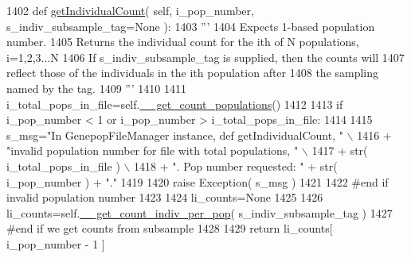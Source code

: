 \begin{DoxyCode}
1402     \textcolor{keyword}{def }\hyperlink{classnegui_1_1genepopfilemanager_1_1GenepopFileManager_a05e723069f5129b21a4d017c2a5317b0}{getIndividualCount}( self, i\_pop\_number, s\_indiv\_subsample\_tag=None ):
1403         \textcolor{stringliteral}{'''}
1404 \textcolor{stringliteral}{        Expects 1-based population number.}
1405 \textcolor{stringliteral}{        Returns the individual count for the ith of N populations, i=1,2,3...N}
1406 \textcolor{stringliteral}{        If s\_indiv\_subsample\_tag is supplied, then the counts will}
1407 \textcolor{stringliteral}{        reflect those of the individuals in the ith population after}
1408 \textcolor{stringliteral}{        the sampling named by the tag.}
1409 \textcolor{stringliteral}{        '''}
1410 
1411         i\_total\_pops\_in\_file=self.\hyperlink{classnegui_1_1genepopfilemanager_1_1GenepopFileManager_a51f6dcbd17c80f8e61114b11283b655f}{\_\_get\_count\_populations}()  
1412 
1413         \textcolor{keywordflow}{if} i\_pop\_number < 1 \textcolor{keywordflow}{or} i\_pop\_number > i\_total\_pops\_in\_file:
1414 
1415             s\_msg=\textcolor{stringliteral}{"In GenepopFileManager instance, def getIndividualCount, "} \(\backslash\)
1416                     + \textcolor{stringliteral}{"invalid population number for file with total populations, "} \(\backslash\)
1417                     + str( i\_total\_pops\_in\_file ) \(\backslash\)
1418                     + \textcolor{stringliteral}{".  Pop number requested: "} + str( i\_pop\_number ) + \textcolor{stringliteral}{"."}
1419 
1420             \textcolor{keywordflow}{raise} Exception( s\_msg )
1421 
1422         \textcolor{comment}{#end if  invalid population number}
1423 
1424         li\_counts=\textcolor{keywordtype}{None}
1425 
1426         li\_counts=self.\hyperlink{classnegui_1_1genepopfilemanager_1_1GenepopFileManager_a8efe11151549d7da2bc024f836491af4}{\_\_get\_count\_indiv\_per\_pop}( s\_indiv\_subsample\_tag )
1427         \textcolor{comment}{#end if we get counts from subsample}
1428 
1429         \textcolor{keywordflow}{return} li\_counts[ i\_pop\_number - 1 ]
\end{DoxyCode}
